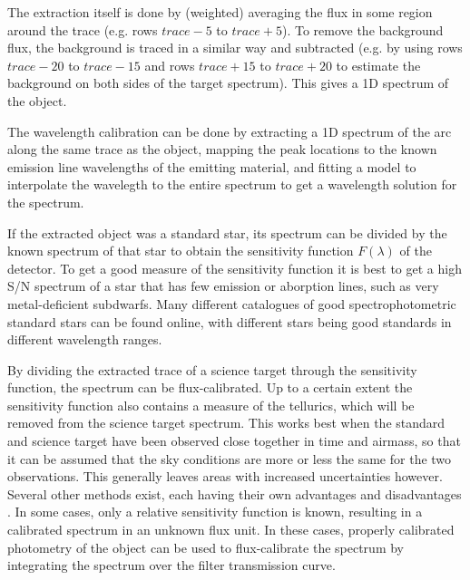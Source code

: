 \documentclass[a4paper,oneside,12pt, class=Latex/Classes/PhDthesisPSnPDF, crop=false]{standalone}
\begin{document}
The extraction itself is done by (weighted) averaging the flux in some region around the trace (e.g. rows $trace - 5$ to $trace + 5$). To remove the background flux, the background is traced in a similar way and subtracted (e.g. by using rows $trace - 20$ to $trace - 15$ and rows $trace + 15$ to $trace + 20$ to estimate the background on both sides of the target spectrum). This gives a 1D spectrum of the object.

The wavelength calibration can be done by extracting a 1D spectrum of the arc along the same trace as the object, mapping the peak locations to the known emission line wavelengths of the emitting material, and fitting a model to interpolate the wavelegth to the entire spectrum to get a wavelength solution for the spectrum.

If the extracted object was a standard star, its spectrum can be divided by the known spectrum of that star to obtain the sensitivity function $F(\lambda)$ of the detector. To get a good measure of the sensitivity function it is best to get a high S/N spectrum of a star that has few emission or aborption lines, such as very metal-deficient subdwarfs. Many different catalogues of good spectrophotometric standard stars can be found online, with different stars being good standards in different wavelength ranges.

By dividing the extracted trace of a science target through the sensitivity function, the spectrum can be flux-calibrated. Up to a certain extent the sensitivity function also contains a measure of the tellurics, which will be removed from the science target spectrum. This works best when the standard and science target have been observed close together in time and airmass, so that it can be assumed that the sky conditions are more or less the same for the two observations. This generally leaves areas with increased uncertainties however. Several other methods exist, each having their own advantages and disadvantages \citep[see e.g.][and references therein for more details]{Telluric_removal}. In some cases, only a relative sensitivity function is known, resulting in a calibrated spectrum in an unknown flux unit. In these cases, properly calibrated photometry of the object can be used to flux-calibrate the spectrum by integrating the spectrum over the filter transmission curve.
\end{document}
